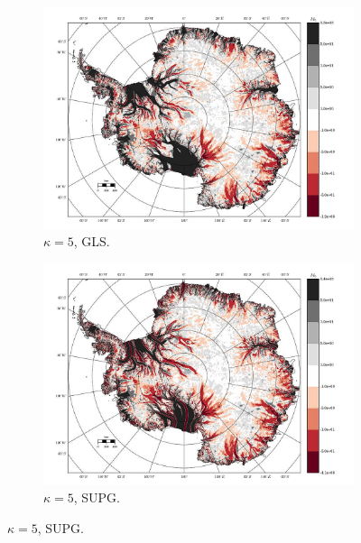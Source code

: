 \begin{figure}
  \begin{subfigure}[b]{0.45\linewidth}
    \includegraphics[width=\linewidth]{images/balance_velocity/antarctica/d_U_ob_S/misfit_10H_kappa_5_GLS.jpg}
  \caption{$\kappa = 5$, GLS.}
  \label{antarctica_bv_image_kappa_5_GLS_U_ob_S_misfit}
  \end{subfigure}
  \begin{subfigure}[b]{0.45\linewidth}
    \includegraphics[width=\linewidth]{images/balance_velocity/antarctica/d_U_ob_S/misfit_10H_kappa_5_SUPG.jpg}
  \caption{$\kappa = 5$, SUPG.}
  \label{antarctica_bv_image_kappa_5_SUPG_U_ob_S_misfit}
  \end{subfigure}


\end{figure}
